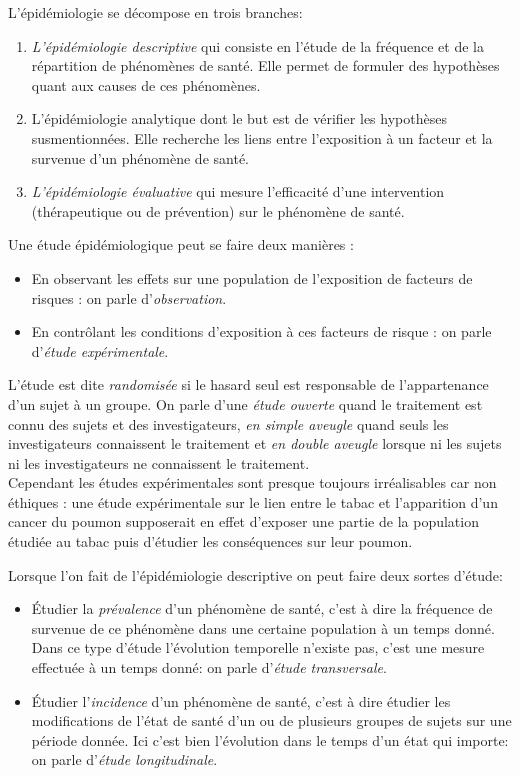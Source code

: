 \documentclass{book}
\begin{document}
\newpage

L'épidémiologie se décompose en trois branches:
\begin{enumerate}
\item \textit{L'épidémiologie descriptive} qui consiste en l'étude de la fréquence et de la répartition de phénomènes de santé.  Elle permet de formuler des hypothèses quant aux causes de ces phénomènes.
\item L'épidémiologie analytique dont le but est de vérifier les hypothèses susmentionnées. Elle recherche les liens entre l'exposition à un facteur et la survenue d'un phénomène de santé.
\item \textit{L'épidémiologie évaluative} qui mesure l'efficacité d'une intervention (thérapeutique ou de prévention) sur le phénomène de santé.
\end{enumerate}

\bigskip

Une étude épidémiologique peut se faire deux manières :
\begin{itemize}
\item En observant les effets sur une population de l'exposition de facteurs de risques : on parle d'\textit{observation}.
\item En contrôlant les conditions d'exposition à ces facteurs de risque : on parle d'\textit{étude expérimentale}.\\
\end{itemize}

\noindent
L'étude est dite \textit{randomisée} si le hasard seul est responsable de l'appartenance d'un sujet à un groupe. On parle d'une \textit{étude ouverte} quand le traitement est connu des sujets et des investigateurs, \textit{en simple aveugle} quand seuls les investigateurs connaissent le traitement et \textit{en double aveugle} lorsque ni les sujets ni les investigateurs ne connaissent le traitement.\\
Cependant les études expérimentales sont presque toujours irréalisables car non éthiques : une étude expérimentale sur le lien entre le tabac et l'apparition d'un cancer du poumon supposerait en effet d'exposer une partie de la population étudiée au tabac puis d'étudier les conséquences sur leur poumon.\\

\bigskip

Lorsque l'on fait de l'épidémiologie descriptive on peut faire deux sortes d'étude:
\begin{itemize}
\item Étudier la \textit{prévalence} d'un phénomène de santé, c'est à dire la fréquence de survenue de ce phénomène dans une certaine population à un temps donné. Dans ce type d'étude l'évolution temporelle n'existe pas, c'est une mesure effectuée à un temps donné: on parle d'\textit{étude transversale}.
\item Étudier l'\textit{incidence} d'un phénomène de santé, c'est à dire étudier les modifications de l'état de santé d'un ou de plusieurs groupes de sujets sur une période donnée. Ici c'est bien l'évolution dans le temps d'un état qui importe: on parle d'\textit{étude longitudinale}.
\end{itemize}
\end{document}
